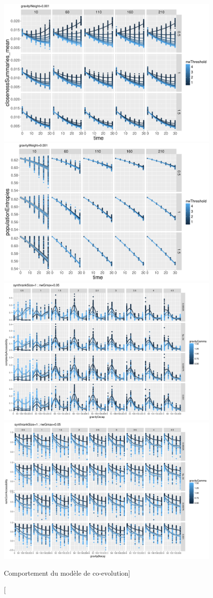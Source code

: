 \begin{figure}[h!]
\includegraphics[width=0.48\linewidth]{Figures/MacroCoEvol/closenessSummaries_mean_gravityWeight0_001}
\includegraphics[width=0.48\linewidth]{Figures/MacroCoEvol/populationEntropies_gravityWeight0_001}\\
\includegraphics[width=0.48\linewidth]{Figures/MacroCoEvol/complexityAccessibility_synthrankSize1_nwGmax0_05}
\includegraphics[width=0.48\linewidth]{Figures/MacroCoEvol/rankCorrAccessibility_synthrankSize1_nwGmax0_05}
\caption[Behavior of the co-evolution model][Comportement du modèle de co-evolution]{}{}
\end{figure}



